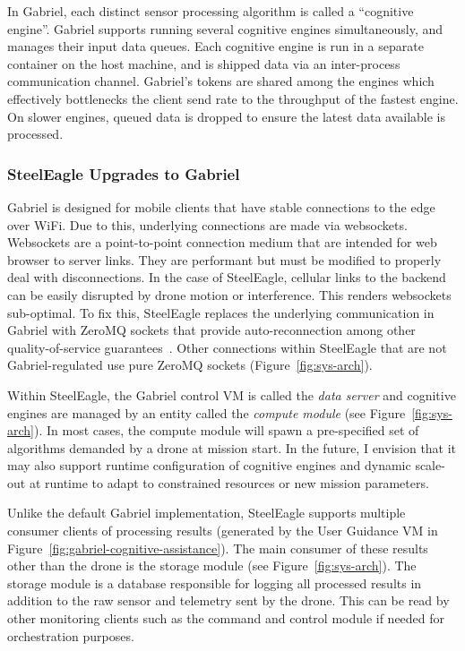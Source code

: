 In Gabriel, each distinct sensor processing algorithm is called a ``cognitive engine''. Gabriel supports running several cognitive engines simultaneously, and manages their input data queues. Each cognitive engine is run in a separate container on the host machine, and is shipped data via an inter-process communication channel. Gabriel's tokens are shared among the engines which effectively bottlenecks the client send rate to the throughput of the fastest engine. On slower engines, queued data is dropped to ensure the latest data available is processed.

\subsubsection{SteelEagle Upgrades to Gabriel}
Gabriel is designed for mobile clients that have stable connections to the edge over WiFi. Due to this, underlying connections are made via websockets. Websockets are a point-to-point connection medium that are intended for web browser to server links. They are performant but must be modified to properly deal with disconnections. In the case of SteelEagle,  cellular links to the backend can be easily disrupted by drone motion or interference. This renders websockets sub-optimal. To fix this, SteelEagle replaces the underlying communication in Gabriel with ZeroMQ sockets that provide auto-reconnection among other quality-of-service guarantees~\cite{ZeroMQ}. Other connections within SteelEagle that are not Gabriel-regulated use pure ZeroMQ sockets (Figure~\ref{fig:sys-arch}).

Within SteelEagle, the Gabriel control VM is called the \textit{data server} and cognitive engines are managed by an entity called the \textit{compute module} (see Figure~\ref{fig:sys-arch}). In most cases, the compute module will spawn a pre-specified set of algorithms demanded by a drone at mission start. In the future, I envision that it may also support runtime configuration of cognitive engines and dynamic scale-out at runtime to adapt to constrained resources or new mission parameters.

Unlike the default Gabriel implementation, SteelEagle supports multiple consumer clients of processing results (generated by the User Guidance VM in Figure~\ref{fig:gabriel-cognitive-assistance}). The main consumer of these results other than the drone is the storage module (see Figure~\ref{fig:sys-arch}). The storage module is a database responsible for logging all processed results in addition to the raw sensor and telemetry sent by the drone. This can be read by other monitoring clients such as the command and control module if needed for orchestration purposes.

